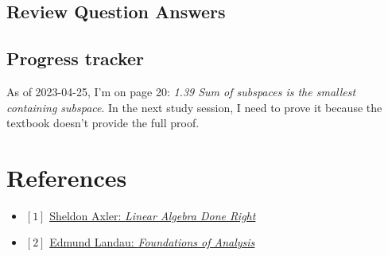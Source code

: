 \documentclass[12pt, letterpaper, oneside]{book}
\begin{document}
\section{Review Question Answers}

\section{Progress tracker}

As of 2023-04-25, I'm on page 20: \textit{1.39 Sum of subspaces is the smallest
containing subspace}. In the next study session, I need to prove it because the
textbook doesn't provide the full proof.

\chapter*{References}

\begin{itemize}
  \item $[1]$ \href{https://linear.axler.net/}{Sheldon Axler: \it{Linear Algebra Done Right}}
  \item $[2]$ \href{https://bookstore.ams.org/view?ProductCode=CHEL/79}{Edmund Landau: \it{Foundations of Analysis}}
\end{itemize}
\end{document}
